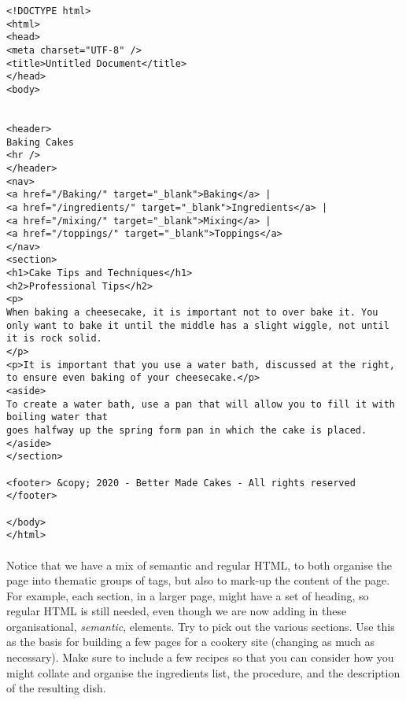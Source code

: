 \documentclass[10pt, a4paper]{article}
\begin{document}
\begin{lstlisting}
<!DOCTYPE html>
<html> 
<head>
<meta charset="UTF-8" />
<title>Untitled Document</title> 
</head>
<body>


<header>
Baking Cakes
<hr />
</header>
<nav>
<a href="/Baking/" target="_blank">Baking</a> |
<a href="/ingredients/" target="_blank">Ingredients</a> | 
<a href="/mixing/" target="_blank">Mixing</a> |
<a href="/toppings/" target="_blank">Toppings</a>
</nav>
<section>
<h1>Cake Tips and Techniques</h1>
<h2>Professional Tips</h2>
<p>
When baking a cheesecake, it is important not to over bake it. You only want to bake it until the middle has a slight wiggle, not until it is rock solid.
</p>
<p>It is important that you use a water bath, discussed at the right, to ensure even baking of your cheesecake.</p>
<aside>
To create a water bath, use a pan that will allow you to fill it with boiling water that
goes halfway up the spring form pan in which the cake is placed.
</aside>
</section>

<footer> &copy; 2020 - Better Made Cakes - All rights reserved </footer>

</body>
</html>
\end{lstlisting}

\paragraph{} Notice that we have a mix of semantic and regular HTML, to both organise the page into thematic groups of tags, but also to mark-up the content of the page. For example, each section, in a larger page, might have a set of heading, so regular HTML is still needed, even though we are now adding in these organisational, \emph{semantic}, elements. Try to pick out the various sections. Use this as the basis for building a few pages for a cookery site (changing as much as necessary). Make sure to include a few recipes so that you can consider how you might collate and organise the ingredients list, the procedure, and the description of the resulting dish.
\end{document}
